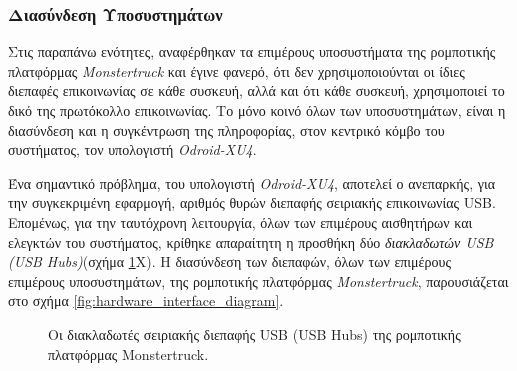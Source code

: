 \bigskip
\subsubsection{Διασύνδεση Υποσυστημάτων} \label{sssec:interconnections}
Στις παραπάνω ενότητες, αναφέρθηκαν τα επιμέρους υποσυστήματα της ρομποτικής πλατφόρμας \textit{Monstertruck} και έγινε φανερό, ότι δεν χρησιμοποιούνται οι ίδιες διεπαφές επικοινωνίας σε κάθε συσκευή, αλλά και ότι κάθε συσκευή, χρησιμοποιεί το δικό της πρωτόκολλο επικοινωνίας. Το μόνο κοινό όλων των υποσυστημάτων, είναι η διασύνδεση και η συγκέντρωση της πληροφορίας, στον κεντρικό κόμβο του συστήματος, τον υπολογιστή \textit{Odroid-XU4}.

\bigskip
Ένα σημαντικό πρόβλημα, του υπολογιστή \textit{Odroid-XU4}, αποτελεί ο ανεπαρκής, για την συγκεκριμένη εφαρμογή, αριθμός θυρών διεπαφής σειριακής επικοινωνίας USB. Επομένως, για την ταυτόχρονη λειτουργία, όλων των επιμέρους αισθητήρων και ελεγκτών του συστήματος, κρίθηκε απαραίτητη η προσθήκη δύο \textit{διακλαδωτών USB (USB Hubs)}(σχήμα \ref{fig:usb_hubs}X). Η διασύνδεση των διεπαφών, όλων των επιμέρους επιμέρους υποσυστημάτων, της ρομποτικής πλατφόρμας \textit{Monstertruck}, παρουσιάζεται στο σχήμα \ref{fig:hardware_interface_diagram}.

\begin{figure}[!ht]
	\centering
	\caption{Οι διακλαδωτές σειριακής διεπαφής USB (USB Hubs) της ρομποτικής  πλατφόρμας Monstertruck.}
	\label{fig:usb_hubs}
\end{figure}


